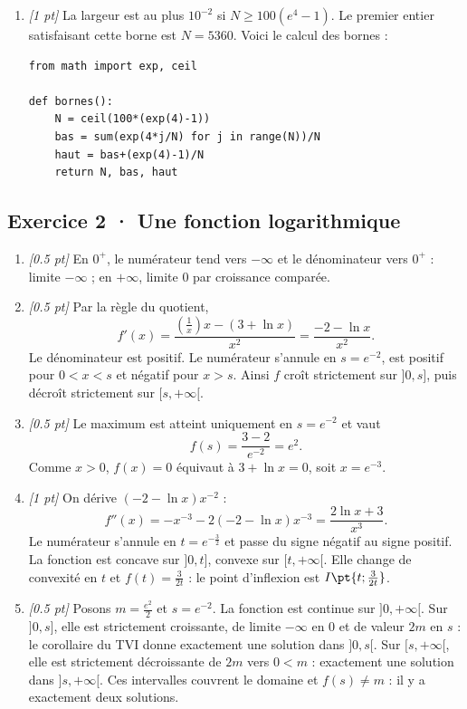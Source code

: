\begin{enumerate}

\item \textit{[1 pt]} La largeur est au plus $10^{-2}$ si $N\ge100(e^{4}-1)$. Le premier entier satisfaisant cette borne est $N=5360$. Voici le calcul des bornes :
\begin{lstlisting}
from math import exp, ceil

def bornes():
    N = ceil(100*(exp(4)-1))
    bas = sum(exp(4*j/N) for j in range(N))/N
    haut = bas+(exp(4)-1)/N
    return N, bas, haut
\end{lstlisting}


\end{enumerate}

\subsection*{Exercice 2 · Une fonction logarithmique}\begin{enumerate}

\item \textit{[\num{0,5} pt]} En $0^+$, le numérateur tend vers $-\infty$ et le dénominateur vers $0^+$ : limite $-\infty$ ; en $+\infty$, limite $0$ par croissance comparée.

\item \textit{[\num{0,5} pt]} Par la règle du quotient,
\[f'(x)=\frac{(\frac{1}{x})x-(3+\ln x)}{x^2}=\frac{-2-\ln x}{x^2}.\]
Le dénominateur est positif. Le numérateur s'annule en $s=e^{-2}$, est positif pour $0<x<s$ et négatif pour $x>s$. Ainsi $f$ croît strictement sur $]0,s]$, puis décroît strictement sur $[s,+\infty[$.

\item \textit{[\num{0,5} pt]} Le maximum est atteint uniquement en $s=e^{-2}$ et vaut
\[f(s)=\frac{3- 2}{e^{-2}}=e^{2}.\]
Comme $x>0$, $f(x)=0$ équivaut à $3+\ln x=0$, soit $x=e^{-3}$.

\item \textit{[1 pt]} On dérive $(-2-\ln x)x^{-2}$ :
\[f''(x)=-x^{-3}-2(-2-\ln x)x^{-3}=\frac{2\ln x+3}{x^3}.\]
Le numérateur s'annule en $t=e^{-\frac{3}{2}}$ et passe du signe négatif au signe positif. La fonction est concave sur $]0,t]$, convexe sur $[t,+\infty[$. Elle change de convexité en $t$ et $f(t)=\frac{3}{2t}$ : le point d'inflexion est $I\pt{t;\frac{3}{2t}}$.

\item \textit{[\num{0,5} pt]} Posons $m=\frac{e^{2}}{2}$ et $s=e^{-2}$. La fonction est continue sur $]0,+\infty[$. Sur $]0,s]$, elle est strictement croissante, de limite $-\infty$ en $0$ et de valeur $2m$ en $s$ : le corollaire du TVI donne exactement une solution dans $]0,s[$. Sur $[s,+\infty[$, elle est strictement décroissante de $2m$ vers $0<m$ : exactement une solution dans $]s,+\infty[$. Ces intervalles couvrent le domaine et $f(s)\ne m$ : il y a exactement deux solutions.


\end{enumerate}
